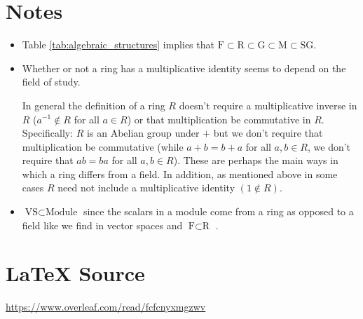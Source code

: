 \documentclass[11pt, oneside]{article}
\theoremstyle{definition}
\begin{document}
\noindent
\section{Notes}
\begin{itemize}
\item Table \ref{tab:algebraic_structures} implies that $\text{F}
\subset \text{R} \subset \text{G} \subset \text{M} \subset \text{SG}$.
\item Whether or not a ring has a multiplicative identity 
      seems to depend on the field of study. 

\smallskip
\noindent
      In general the definition of a ring $R$ doesn't require a
      multiplicative inverse in $R$ ($a^{-1} \notin R$ for all $a
      \in R$) or that multiplication be commutative in
      $R$. Specifically: $R$ is an Abelian group under $+$ but we
      don't require that multiplication be commutative (while
      $a+b = b+a$ for all $a,b \in R$, we don't require that $ab
      = ba$ for all $a,b \in R$). These are perhaps the main ways
      in which a ring differs from a field. In addition, as
      mentioned above in some cases $R$ need not include a
      multiplicative identity $(1 \notin R)$.
\item $\text{VS} \subset \text{Module}$ since the scalars in a
      module come from a ring as opposed to a field like we find
      in vector spaces and $\text{F} \subset \text{R}$
\cite{module_theory_blyth}.
\end{itemize}
%
%
%
%
%
\section*{\LaTeX \hspace{0.10 mm} Source}
\url{https://www.overleaf.com/read/fcfcnyxmgzwv}
%
%
%


%
%
\end{document}
